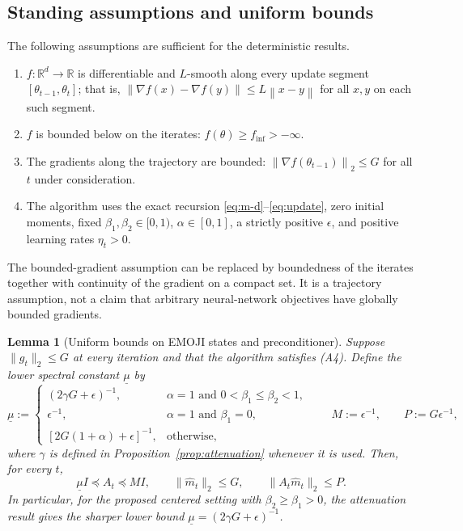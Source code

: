 \documentclass[11pt]{article}
\newtheorem{lemma}[theorem]{Lemma}
\newcommand{\R}{\mathbb{R}}
\newcommand{\norm}[1]{\left\lVert #1\right\rVert}
\begin{document}
\subsection{Standing assumptions and uniform bounds}
The following assumptions are sufficient for the deterministic results.
\begin{enumerate}[label=(A\arabic*)]
 \item $f:\R^d\to\R$ is differentiable and $L$-smooth along every update segment $[\theta_{t-1},\theta_t]$; that is, $\norm{\nabla f(x)-\nabla f(y)}\le L\norm{x-y}$ for all $x,y$ on each such segment.
 \item $f$ is bounded below on the iterates: $f(\theta)\ge f_{\inf}>-\infty$.
 \item The gradients along the trajectory are bounded: $\norm{\nabla f(\theta_{t-1})}_2\le G$ for all $t$ under consideration.
 \item The algorithm uses the exact recursion \eqref{eq:m-d}--\eqref{eq:update}, zero initial moments, fixed $\beta_1,\beta_2\in[0,1)$, $\alpha\in[0,1]$, a strictly positive $\epsilon$, and positive learning rates $\eta_t>0$.
\end{enumerate}
The bounded-gradient assumption can be replaced by boundedness of the iterates together with continuity of the gradient on a compact set. It is a trajectory assumption, not a claim that arbitrary neural-network objectives have globally bounded gradients.

\begin{lemma}[Uniform bounds on EMOJI states and preconditioner]\label{lem:preconditioner}
Suppose $\|g_t\|_2\leq G$ at every iteration and that the algorithm satisfies (A4). Define the lower spectral constant $\underline\mu$ by
\begin{equation}
 \underline\mu:=
 \begin{cases}
 (2\gamma G+\epsilon)^{-1},&\alpha=1\text{ and }0<\beta_1\leq\beta_2<1,\\
 \epsilon^{-1},&\alpha=1\text{ and }\beta_1=0,\\
 [2G(1+\alpha)+\epsilon]^{-1},&\text{otherwise},
 \end{cases}
 \qquad
 M:=\epsilon^{-1},\qquad P:=G\epsilon^{-1},
 \label{eq:constants}
\end{equation}
where $\gamma$ is defined in Proposition~\ref{prop:attenuation} whenever it is used. Then, for every $t$,
\begin{equation}
 \underline\mu I\preceq A_t\preceq MI,
 \qquad \|\widehat m_t\|_2\leq G,
 \qquad \|A_t\widehat m_t\|_2\leq P.
 \label{eq:matrix-bounds}
\end{equation}
In particular, for the proposed centered setting with $\beta_2\geq\beta_1>0$, the attenuation result gives the sharper lower bound $\underline\mu=(2\gamma G+\epsilon)^{-1}$.
\end{lemma}
\end{document}
